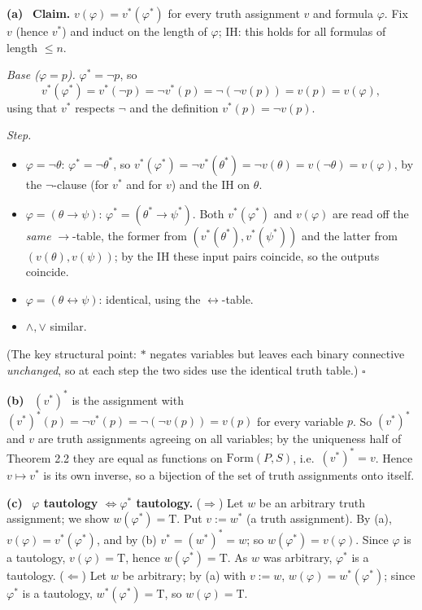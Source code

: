 \documentclass[11pt]{article}
\newcommand{\Form}{\mathrm{Form}}
\newcommand{\T}{\mathrm{T}}
\newcommand{\solpart}[1]{\smallskip\noindent\textbf{(#1)}\ }
\begin{document}
\solpart{a} \textbf{Claim.} $v(\varphi)=v^*(\varphi^*)$ for every truth assignment
$v$ and formula $\varphi$. Fix $v$ (hence $v^*$) and induct on the length of
$\varphi$; IH: this holds for all formulas of length $\le n$.

\emph{Base ($\varphi=p$).} $\varphi^*=\lnot p$, so
\[
v^*(\varphi^*)=v^*(\lnot p)=\lnot v^*(p)=\lnot(\lnot v(p))=v(p)=v(\varphi),
\]
using that $v^*$ respects $\lnot$ and the definition $v^*(p)=\lnot v(p)$.

\emph{Step.}
\begin{itemize}[nosep]
\item $\varphi=\lnot\theta$: $\varphi^*=\lnot\theta^*$, so
$v^*(\varphi^*)=\lnot v^*(\theta^*)=\lnot v(\theta)=v(\lnot\theta)=v(\varphi)$,
by the $\lnot$-clause (for $v^*$ and for $v$) and the IH on $\theta$.
\item $\varphi=(\theta\to\psi)$: $\varphi^*=(\theta^*\to\psi^*)$. Both
$v^*(\varphi^*)$ and $v(\varphi)$ are read off the \emph{same} $\to$-table, the
former from $(v^*(\theta^*),v^*(\psi^*))$ and the latter from $(v(\theta),v(\psi))$;
by the IH these input pairs coincide, so the outputs coincide.
\item $\varphi=(\theta\leftrightarrow\psi)$: identical, using the
$\leftrightarrow$-table.
\item $\land,\lor$ similar.
\end{itemize}
(The key structural point: $*$ negates variables but leaves each binary connective
\emph{unchanged}, so at each step the two sides use the identical truth table.)
\hfill$\square$

\solpart{b} $(v^*)^*$ is the assignment with $(v^*)^*(p)=\lnot v^*(p)=\lnot(\lnot
v(p))=v(p)$ for every variable $p$. So $(v^*)^*$ and $v$ are truth assignments
agreeing on all variables; by the uniqueness half of Theorem 2.2 they are equal as
functions on $\Form(P,S)$, i.e.\ $(v^*)^*=v$. Hence $v\mapsto v^*$ is its own
inverse, so a bijection of the set of truth assignments onto itself.

\solpart{c} \textbf{$\varphi$ tautology $\iff\varphi^*$ tautology.}
($\Rightarrow$) Let $w$ be an arbitrary truth assignment; we show $w(\varphi^*)=\T$.
Put $v:=w^*$ (a truth assignment). By (a), $v(\varphi)=v^*(\varphi^*)$, and by (b)
$v^*=(w^*)^*=w$; so $w(\varphi^*)=v(\varphi)$. Since $\varphi$ is a tautology,
$v(\varphi)=\T$, hence $w(\varphi^*)=\T$. As $w$ was arbitrary, $\varphi^*$ is a
tautology.
($\Leftarrow$) Let $w$ be arbitrary; by (a) with $v:=w$, $w(\varphi)=w^*(\varphi^*)$;
since $\varphi^*$ is a tautology, $w^*(\varphi^*)=\T$, so $w(\varphi)=\T$.
\end{document}

